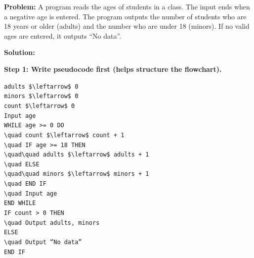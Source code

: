 \documentclass[11pt]{article}
\begin{document}
\begin{exoresolu}
\textbf{Problem:} A program reads the ages of students in a class. The input ends when a negative age is entered. The program outputs the number of students who are 18 years or older (adults) and the number who are under 18 (minors). If no valid ages are entered, it outputs ``No data''.

\textbf{Solution:}

\par\noindent\textbf{Step 1: Write pseudocode first (helps structure the flowchart).}
\begin{center}
\texttt{adults \$\textbackslash{}leftarrow\$ 0}\\
\texttt{minors \$\textbackslash{}leftarrow\$ 0}\\
\texttt{count \$\textbackslash{}leftarrow\$ 0}\\
\texttt{Input age}\\
\texttt{WHILE age >= 0 DO}\\
\texttt{\textbackslash{}quad count \$\textbackslash{}leftarrow\$ count + 1}\\
\texttt{\textbackslash{}quad IF age >= 18 THEN}\\
\texttt{\textbackslash{}quad\textbackslash{}quad adults \$\textbackslash{}leftarrow\$ adults + 1}\\
\texttt{\textbackslash{}quad ELSE}\\
\texttt{\textbackslash{}quad\textbackslash{}quad minors \$\textbackslash{}leftarrow\$ minors + 1}\\
\texttt{\textbackslash{}quad END IF}\\
\texttt{\textbackslash{}quad Input age}\\
\texttt{END WHILE}\\
\texttt{IF count > 0 THEN}\\
\texttt{\textbackslash{}quad Output adults, minors}\\
\texttt{ELSE}\\
\texttt{\textbackslash{}quad Output ``No data''}\\
\texttt{END IF}
\end{center}


\end{exoresolu}
\end{document}
